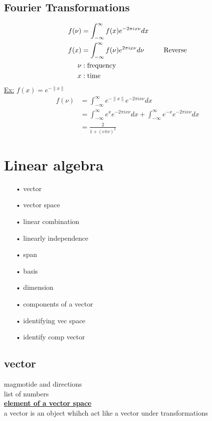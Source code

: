 \documentclass[12pt, a4paper]{article}
\newcommand{\tab}[1][1cm]{\hspace*{#1}}
\begin{document}
\subsection{Fourier Transformations}
\begin{align*}
f(\nu) &= \int_{-\infty}^{\infty}f(x)e^{-2\pi i x\nu}dx\\
f(x) &= \int_{-\infty}^{\infty}f(\nu)e^{2\pi i x \nu}d\nu \tab \text{Reverse}\\
\nu&: \text{frequency}\\
x&: \text{time}
\end{align*}
\underline{Ex:}
$f(x) = e^{-\|x\|}$
\begin{align*}
f(\nu)&=\int_{-\infty}^{\infty}e^{-\|x\|}e^{-2\pi i x \nu}dx\\
&=\int_{-\infty}^{\infty}e^{x}e^{-2\pi i x \nu}dx + \int_{-\infty}^{\infty}e^{-x}e^{-2\pi i x \nu}dx\\
&=\frac{2}{1+(e\pi \nu)^2}
\end{align*}

\section{Linear algebra}
\begin{enumerate}
\item[•] vector
\item[•] vector space
\item[•] linear combination
\item[•] linearly independence
\item[•] span
\item[•] basis
\item[•] dimension
\item[•] components of a vector
\item[•] identifying vec space
\item[•] identify comp vector
\end{enumerate}
\subsection{vector}
magmotide and directions\\
list of numbers\\
\textbf{\underline{element of a vector space}}\\
a vector is an object whihch act like a vector under transformations
\end{document}
